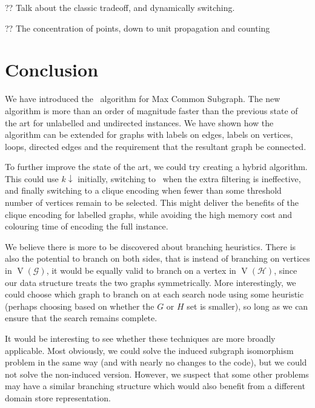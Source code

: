 \documentclass[letterpaper]{article}
\newcommand{\McSplit}{\textproc{McSplit}}
\newcommand{\graphG}{\mathcal{G}}
\newcommand{\graphH}{\mathcal{H}}
\newcommand{\setG}{G}
\newcommand{\setH}{H}
\DeclareMathOperator{\V}{V}
\begin{document}
?? Talk about the classic tradeoff, and dynamically switching.

?? The concentration of points, down to unit propagation and counting

\section{Conclusion}

We have introduced the \McSplit\ algorithm for Max Common Subgraph.  The new
algorithm is more than an order of magnitude faster than the previous state of
the art for unlabelled and undirected instances. We have shown how the
algorithm can be extended for graphs with labels on edges, labels on vertices,
loops, directed edges and the requirement that the resultant graph be
connected.

To further improve the state of the art, we could try creating a hybrid
algorithm.  This could use $k\downarrow$ initially, switching to \McSplit\ when
the extra filtering is ineffective, and finally switching to a clique encoding
when fewer than some threshold number of vertices remain to be selected. This
might deliver the benefits of the clique encoding for labelled graphs, while
avoiding the high memory cost and colouring time of encoding the full instance.

We believe there is more to be discovered about branching heuristics. There is
also the potential to branch on both sides, that is instead of branching on
vertices in $\V(\graphG)$, it would be equally valid to branch on a vertex in
$\V(\graphH)$, since our data structure treats the two graphs symmetrically. More
interestingly, we could choose which graph to branch on at each search node
using some heuristic (perhaps choosing based on whether the $\setG$ or $\setH$ set is
smaller), so long as we can ensure that the search remains complete.

It would be interesting to see whether these techniques are more broadly
applicable. Most obviously, we could solve the induced subgraph isomorphism
problem in the same way (and with nearly no changes to the code), but we could
not solve the non-induced version. However, we suspect that some other problems
may have a similar branching structure which would also benefit from a
different domain store representation.

\newpage



\end{document}
